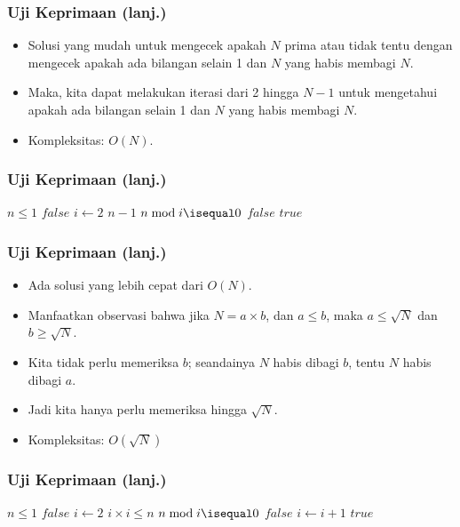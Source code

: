 \begin{frame}
\frametitle{Uji Keprimaan (lanj.)}
\begin{itemize}
  \item Solusi yang mudah untuk mengecek apakah $N$ prima atau tidak tentu dengan mengecek apakah ada bilangan selain 1 dan $N$ yang habis membagi $N$.
  \item Maka, kita dapat melakukan iterasi dari 2 hingga $N-1$ untuk mengetahui apakah ada bilangan selain 1 dan $N$ yang habis membagi $N$.
  \item Kompleksitas: $O(N)$.
\end{itemize}
\end{frame}

\begin{frame}
\frametitle{Uji Keprimaan (lanj.)}

\begin{codebox}
\li \If $n \le 1$
    \Then
\li   \Return $false$
    \End
\zi
\li \For $i \gets 2$ \To $n-1$
    \Do
\li   \If $n \bmod i \isequal 0$
      \Then
\li     \Return $false$
      \End    
    \End
\zi
\li \Return $true$
\end{codebox}
\end{frame}

\begin{frame}
\frametitle{Uji Keprimaan (lanj.)}
\begin{itemize}
  \item Ada solusi yang lebih cepat dari $O(N)$.
  \item Manfaatkan observasi bahwa jika $N = a \times b$, dan $a \leq b$, maka $a \leq \sqrt{N}$ dan $b \geq \sqrt{N}$.
  \item Kita tidak perlu memeriksa $b$; seandainya $N$ habis dibagi $b$, tentu $N$ habis dibagi $a$.
  \item Jadi kita hanya perlu memeriksa hingga $\sqrt{N}$.
  \item Kompleksitas: $O(\sqrt{N})$
\end{itemize}
\end{frame}

\begin{frame}
\frametitle{Uji Keprimaan (lanj.)}
\begin{codebox}
\li \If $n \le 1$
    \Then
\li   \Return $false$
    \End
\zi
\li $i \gets 2$
\li \While $i \times i \leq n$
    \Do
\li   \If $n \bmod i \isequal 0$
      \Then
\li     \Return $false$
      \End
\li   $i \gets i + 1$          
    \End
\zi
\li \Return $true$
\end{codebox}
\end{frame}

